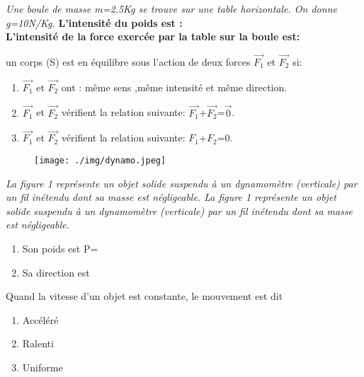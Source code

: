 \documentclass[12pt]{article}
\begin{document}
\begin{multicols}{2}
\begin{enumerate}
\item \emph{Une boule de masse m=2.5Kg se trouve sur une table horizontale. On donne g=10N/Kg.}
	\textbf{L’intensité du poids est :}\dotfill
	\\\textbf{L’intensité de la force exercée par la table sur la boule est:}\dotfill
\item un corps (S) est en équilibre sous l’action de deux forces $\vec{F_1}$
et $\vec{F_2}$ si:
\begin{enumerate}
	\item $\vec{F_1}$ et $\vec{F_2}$ ont : même sens ,même intensité et même direction.

	\item $\vec{F_1}$ et $\vec{F_2}$  vérifient la relation suivante: $\vec{F_1}$+$\vec{F_2}$=$\vec{0}$.

	\item $\vec{F_1}$ et $\vec{F_2}$  vérifient la relation suivante: $F_1$+$F_2$=0.
\end{enumerate}

\begin{minipage}{\linewidth} 
\begin{wrapfigure}{r}{0.9in} 
\vspace{-12pt} 
\texttt{[image: ./img/dynamo.jpeg]}
\vspace{-1cm}
\caption{}
\end{wrapfigure} 

\item \emph{La figure 1 représente un objet solide suspendu à un dynamomètre (verticale) par un fil inétendu dont sa masse est
négligeable. La figure  1 représente un
objet solide suspendu à un dynamomètre (verticale) par un fil
inétendu dont sa masse est négligeable.}

\end{minipage}
\begin{enumerate}
	\item Son poids est P=\dotfill
	\item Sa direction est\dotfill
\end{enumerate}
\item Quand la vitesse d’un objet est constante, le mouvement est dit
	\begin{enumerate}
		\item Accéléré
		\item Ralenti
		\item Uniforme
	\end{enumerate}

\end{enumerate}

\end{multicols}
\end{document}
